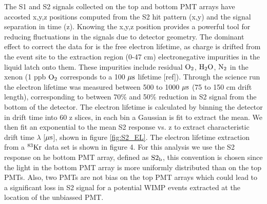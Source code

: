 The S1 and S2 signals collected on the top and bottom PMT arrays have accosted x,y,z positions computed from the S2 hit pattern (x,y) and the signal separation in time (z). Knowing the x,y,z position provides a powerful tool for reducing fluctuations in the signals due to detector geometry. The dominant effect to correct the data for is the free electron lifetime, as charge is drifted from the event site to the extraction region (0-47 cm) electronegative impurities in the liquid latch onto them. These impurities include residual $\rm O_2$, $\rm H_2O$, $\rm N_2$ in the xenon (1 ppb $\rm O_2$ corresponds to a 100 $\rm \mu s$ lifetime [ref]). Through the science run the electron lifetime was measured between 500 to 1000 $\rm \mu s$ (75 to 150 cm drift length), corresponding to between 70\% and 50\% reduction in S2 signal from the bottom of the detector. 
The electron lifetime is calculated by binning the detector in drift time into 60 z slices, in each bin a Gaussian is fit to extract the mean. We then fit an exponential to the mean S2 response vs. z to extract characteristic drift time $\lambda$ [$\rm \mu s$], shown in figure \ref{fig:S2_EL}. The electron lifetime extraction from a $\rm^{83}Kr$ data set is shown in figure 4.  For this analysis we use the S2 response on he bottom PMT array, defined as $\rm S2_b$, this convention is chosen since the light in the bottom PMT array is more uniformly distributed than on the top PMTs. Also, two PMTs are not bias on the top PMT arrays which could lead to a significant loss in S2 signal for a potential WIMP events extracted at the location of the unbiassed PMT.


